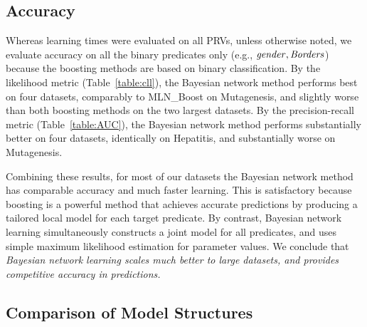 \documentclass[runningheads,a4paper]{llncs}
\begin{document}
\subsection{Accuracy} Whereas learning times were evaluated on all PRVs, unless otherwise noted, we evaluate accuracy on all the  binary predicates only (e.g., $\it{gender},\it{Borders}$) because the boosting methods are based on binary classification. By the likelihood metric (Table~\ref{table:cll}), the Bayesian network method performs best on four datasets, comparably to MLN\_Boost on Mutagenesis, and slightly worse than both boosting methods on the two largest datasets. By the precision-recall metric (Table~\ref{table:AUC}), the Bayesian network method performs substantially better on four datasets, identically on Hepatitis, and substantially worse on Mutagenesis.

Combining these results, for most of our datasets the Bayesian network method has comparable accuracy and much faster learning. This is satisfactory because boosting is a powerful method that achieves accurate predictions by producing a tailored local model for each target predicate. By contrast, Bayesian network learning simultaneously constructs a joint model for all predicates, and uses simple maximum likelihood estimation for parameter values.
We conclude that \emph{Bayesian network  learning scales much better to large datasets, and provides competitive accuracy in predictions.} 
 
\subsection{Comparison of Model Structures} 
\end{document}
